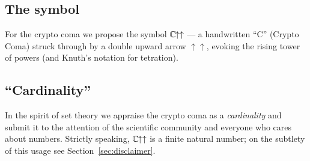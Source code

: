 \subsection{The symbol}
For the crypto coma we propose the symbol \(\mathbb{C}\mkern-1.5mu{\uparrow\uparrow}\) --- a handwritten ``C'' (Crypto Coma)
struck through by a double upward arrow \(\uparrow\uparrow\), evoking the rising tower of
powers (and Knuth's notation for tetration).

\subsection{``Cardinality''}
In the spirit of set theory we appraise the crypto coma as a \emph{cardinality} and submit
it to the attention of the scientific community and everyone who cares about numbers.
Strictly speaking, \(\mathbb{C}\mkern-1.5mu{\uparrow\uparrow}\) is a finite natural number; on the subtlety of this usage see
Section~\ref{sec:disclaimer}.
